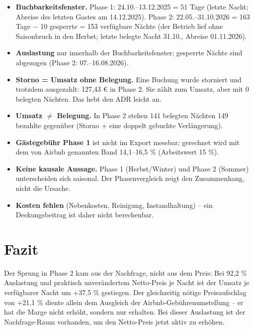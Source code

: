 \documentclass[11pt,a4paper]{article}
\begin{document}
\begin{itemize}
  \item \textbf{Buchbarkeitsfenster.} Phase 1: 24.10.--13.12.2025 = 51 Tage (letzte
        Nacht; Abreise des letzten Gastes am 14.12.2025). Phase 2: 22.05.--31.10.2026
        = 163 Tage $-$ 10 gesperrte = 153 verfügbare Nächte (der Betrieb lief ohne
        Saisonbruch in den Herbst; letzte belegte Nacht 31.10., Abreise 01.11.2026).
  \item \textbf{Auslastung} nur innerhalb der Buchbarkeitsfenster; gesperrte Nächte sind
        abgezogen (Phase 2: 07.--16.08.2026).
  \item \textbf{Storno = Umsatz ohne Belegung.} Eine Buchung wurde storniert und trotzdem
        ausgezahlt: 127,43 € in Phase 2. Sie zählt zum Umsatz, aber mit 0 belegten Nächten.
        Das hebt den ADR leicht an.
  \item \textbf{Umsatz $\neq$ Belegung.} In Phase 2 stehen 141 belegten Nächten 149
        bezahlte gegenüber (Storno + eine doppelt gebuchte Verlängerung).
  \item \textbf{Gästegebühr Phase 1} ist nicht im Export messbar; gerechnet wird mit dem
        von Airbnb genannten Band 14,1--16,5 \% (Arbeitswert 15 \%).
  \item \textbf{Keine kausale Aussage.} Phase 1 (Herbst/Winter) und Phase 2 (Sommer)
        unterscheiden sich saisonal. Der Phasenvergleich zeigt den Zusammenhang, nicht die
        Ursache.
  \item \textbf{Kosten fehlen} (Nebenkosten, Reinigung, Instandhaltung) – ein
        Deckungsbeitrag ist daher nicht berechenbar.
\end{itemize}

\section{Fazit}

Der Sprung in Phase 2 kam aus der Nachfrage, nicht aus dem Preis: Bei 92,2 \%
Auslastung und praktisch unverändertem Netto-Preis je Nacht ist der Umsatz je
verfügbarer Nacht um +37,5 \% gestiegen. Der gleichzeitig nötige Preisaufschlag von
+21,1 \% diente allein dem Ausgleich der Airbnb-Gebührenumstellung – er hat die Marge
nicht erhöht, sondern nur erhalten. Bei dieser Auslastung ist der Nachfrage-Raum
vorhanden, um den Netto-Preis jetzt aktiv zu erhöhen.
\end{document}
